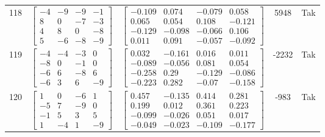 \documentclass[a4paper,12pt]{article}
\begin{document}
\begin{tabular}{c c c c c}
118
&
$\begin{bmatrix} -4 & -9 & -9 & -1 \\ 8 & 0 & -7 & -3 \\ 4 & 8 & 0 & -8 \\ 5 & -6 & -8 & -9 \end{bmatrix}$
&
$\begin{bmatrix} -0.109 & 0.074 & -0.079 & 0.058 \\ 0.065 & 0.054 & 0.108 & -0.121 \\ -0.129 & -0.098 & -0.066 & 0.106 \\ 0.011 & 0.091 & -0.057 & -0.092 \end{bmatrix}$
&
5948
&
Tak
\\
119
&
$\begin{bmatrix} -4 & -4 & -3 & 0 \\ -8 & 0 & -1 & 0 \\ -6 & 6 & -8 & 6 \\ -6 & 3 & 6 & -9 \end{bmatrix}$
&
$\begin{bmatrix} 0.032 & -0.161 & 0.016 & 0.011 \\ -0.089 & -0.056 & 0.081 & 0.054 \\ -0.258 & 0.29 & -0.129 & -0.086 \\ -0.223 & 0.282 & -0.07 & -0.158 \end{bmatrix}$
&
-2232
&
Tak
\\
120
&
$\begin{bmatrix} 1 & 0 & -6 & 1 \\ -5 & 7 & -9 & 0 \\ -1 & 5 & 3 & 5 \\ 1 & -4 & 1 & -9 \end{bmatrix}$
&
$\begin{bmatrix} 0.457 & -0.135 & 0.414 & 0.281 \\ 0.199 & 0.012 & 0.361 & 0.223 \\ -0.099 & -0.026 & 0.051 & 0.017 \\ -0.049 & -0.023 & -0.109 & -0.177 \end{bmatrix}$
&
-983
&
Tak
\\
\end{tabular} \egroup \newpage
\end{document}
